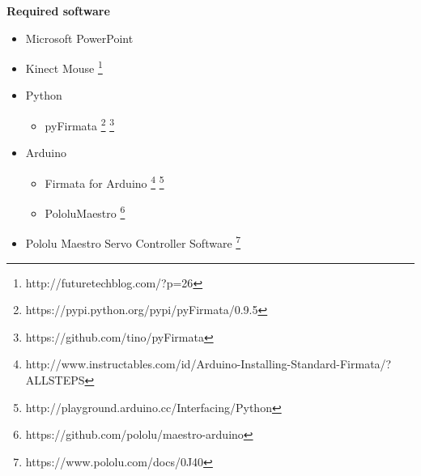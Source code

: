\documentclass[12pt]{article}
\begin{document}
\begin{description}
		\textbf{Required software}
		\begin{itemize}
			\item Microsoft PowerPoint
			\item Kinect Mouse \footnote{http://futuretechblog.com/?p=26}
			\item Python
			\begin{itemize}
				\item pyFirmata \footnote{https://pypi.python.org/pypi/pyFirmata/0.9.5} \footnote{https://github.com/tino/pyFirmata}
			\end{itemize}
			\item Arduino
			\begin{itemize}
				\item Firmata for Arduino \footnote{http://www.instructables.com/id/Arduino-Installing-Standard-Firmata/?ALLSTEPS} \footnote{http://playground.arduino.cc/Interfacing/Python}
				\item PololuMaestro \footnote{https://github.com/pololu/maestro-arduino}
			\end{itemize}
			\item Pololu Maestro Servo Controller Software \footnote{https://www.pololu.com/docs/0J40}
		\end{itemize}
		

\end{description}
\end{document}
